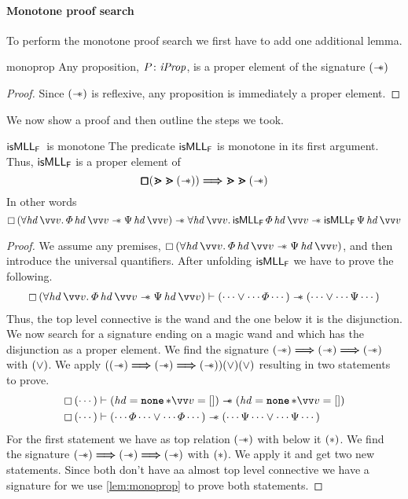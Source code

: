 \documentclass[thesis.tex]{subfiles}
\begin{document}
\paragraph*{Monotone proof search}
To perform the monotone proof search we first have to add one additional lemma.
\begin{lemma}{}{monoprop}
    Any proposition, $P\colon \textit{iProp}$, is a proper element of the signature
    $(\mathrel{-\!\!\ast})$
\end{lemma}
\begin{proof}
    Since $(\mathrel{-\!\!\ast})$ is reflexive, any proposition is immediately a proper element.
\end{proof}
\noindent We now show a proof and then outline the steps we took.
\begin{example}{$\textsf{\upshape isMLL}_{\textsf{\upshape F}}$\ is monotone}{}
    The predicate $\textsf{\upshape isMLL}_{\textsf{\upshape F}}$ is monotone in its first argument. Thus, $\textsf{\upshape isMLL}_{\textsf{\upshape F}}$ is a proper element of
    \[
        \pmb{\mathop{\boxempty}} (\bm{\gtrdot} \bm{\gtrdot} (\mathrel{-\!\!\ast})) \bm{\Longrightarrow} \bm{\gtrdot} \bm{\gtrdot} (\mathrel{-\!\!\ast})
    \]
    In other words
    \[
        \always{(\All \hd\, \vect{v}. \pred\, \hd\, \vect{v} \wand \predB\, \hd\, \vect{v})} \wand \All \hd\, \vect{v}. \isMLL_\hopred\, \pred\, \hd\, \vect{v} \wand \isMLL_\hopred\, \predB\, \hd\, \vect{v}
    \]


    \begin{proof}
        We assume any premises, $\always{(\All \hd\, \vect{v}. \pred\, \hd\, \vect{v} \wand \predB\, \hd\, \vect{v})}$, and then introduce the universal quantifiers. After unfolding $\textsf{\upshape isMLL}_{\textsf{\upshape F}}$ we have to prove the following.
        \begin{align*}
            \always{(\All \hd\, \vect{v}. \pred\, \hd\, \vect{v} \wand \predB\, \hd\, \vect{v})} \proves (\cdots \lor \cdots \pred \cdots) \wand (\cdots \lor \cdots \predB \cdots)
        \end{align*}
        Thus, the top level connective is the wand and the one below it is the disjunction. We now search for a signature ending on a magic wand and which has the disjunction as a proper element. We find the signature ${(\mathrel{-\!\!\ast}) \bm{\Longrightarrow} (\mathrel{-\!\!\ast}) \bm{\Longrightarrow} (\mathrel{-\!\!\ast})}$ with $(\lor)$. We apply $((\mathrel{-\!\!\ast}) \bm{\Longrightarrow} (\mathrel{-\!\!\ast}) \bm{\Longrightarrow} (\mathrel{-\!\!\ast})) (\lor) (\lor)$ resulting in two statements to prove.
        \begin{align*}
            \always{(\cdots)} & \proves (\hd = \None * \vect{\val} = []) \wand (\hd = \None * \vect{\val} = [])                                \\
            \always{(\cdots)} & \proves (\cdots \pred \cdots \lor \cdots  \pred \cdots) \wand (\cdots \predB \cdots \lor \cdots \predB \cdots)
        \end{align*}
        For the first statement we have as top relation $(\mathrel{-\!\!\ast})$ with below it $(*)$. We find the signature ${(\mathrel{-\!\!\ast}) \bm{\Longrightarrow} (\mathrel{-\!\!\ast}) \bm{\Longrightarrow} (\mathrel{-\!\!\ast})}$ with $(*)$. We apply it and get two new statements. Since both don't have aa almost top level connective we have a signature for we use \cref*{lem:monoprop} to prove both statements.


\end{proof}
\end{example}
\end{document}
